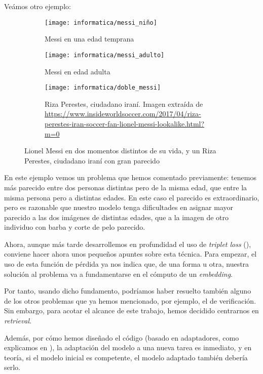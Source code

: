 Veámos otro ejemplo:

\begin{figure}[H]
\centering
    \begin{subfigure}{0.5\textwidth}
        \centering
        \texttt{[image: informatica/messi\_niño]}
        \caption{Messi en una edad temprana}
    \end{subfigure}%
    \begin{subfigure}{.5\textwidth}
        \centering
        \texttt{[image: informatica/messi\_adulto]}
        \caption{Messi en edad adulta}
    \end{subfigure}

    \begin{subfigure}{.8\textwidth}
        \centering
        \texttt{[image: informatica/doble\_messi]}
        \caption{Riza Perestes, ciudadano iraní. Imagen extraída de \url{https://www.insideworldsoccer.com/2017/04/riza-perestes-iran-soccer-fan-lionel-messi-lookalike.html?m=0}}
    \end{subfigure}

\caption{Lionel Messi en dos momentos distintos de su vida, y un Riza Perestes, ciudadano iraní con gran parecido}
\label{img:messi_distintos_otro_adulto}
\end{figure}

En este ejemplo vemos un problema que hemos comentado previamente: tenemos más parecido entre dos personas distintas pero de la misma edad, que entre la misma persona pero a distintas edades. En este caso el parecido es extraordinario, pero es razonable que nuestro modelo tenga dificultades en asignar mayor parecido a las dos imágenes de distintas edades, que a la imagen de otro individuo con barba y corte de pelo parecido.

Ahora, aunque más tarde desarrollemos en profundidad el uso de \textit{triplet loss} (), conviene hacer ahora unos pequeños apuntes sobre esta técnica. Para empezar, el uso de esta función de pérdida ya nos indica que, de una forma u otra, nuestra solución al problema va a fundamentarse en el cómputo de un \textit{embedding}.

Por tanto, usando dicho fundamento, podríamos haber resuelto también alguno de los otros problemas que ya hemos mencionado, por ejemplo, el de verificación. Sin embargo, para acotar el alcance de este trabajo, hemos decidido centrarnos en \textit{retrieval}.

Además, por cómo hemos diseñado el código (basado en adaptadores, como explicamos en ), la adaptación del modelo a una nueva tarea es inmediato, y en teoría, si el modelo inicial es competente, el modelo adaptado también debería serlo.

